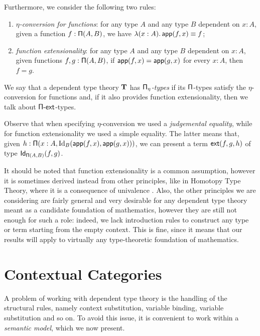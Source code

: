 \noindent
Furthermore, we consider the following two rules:
\begin{enumerate}[resume]
  \item \emph{$\eta$-conversion for functions}: for any type $A$ and any type $B$
    dependent on $x:A$, given a function $f:\operatorname{\mathsf{\Pi}}(A,B)$, we have
    $\lambda(x:A).\operatorname{\mathsf{app}}(f,x)\equiv f$;
  \item \emph{function extensionality}: for any type $A$ and any type $B$ dependent on
    $x:A$, given functions $f,g:\operatorname{\mathsf{\Pi}}(A,B)$, if $\operatorname{\mathsf{app}}(f,x)=\operatorname{\mathsf{app}}(g,x)$ for every
    $x:A$, then $f=g$.
\end{enumerate}

\begin{defn}
  We say that a dependent type theory $\operatorname{\mathbf{T}}$ has \emph{$\operatorname{\mathsf{\Pi}_\eta}$-types} if its
  $\operatorname{\mathsf{\Pi}}$-types satisfy the $\eta$-conversion for functions and, if it also
  provides function extensionality, then we talk about $\operatorname{\mathsf{\Pi-ext}}$-types.
\end{defn}

\begin{rmk}
  Observe that when specifying $\eta$-conversion we used a \emph{judgemental
  equality}, while for function extensionality we used a simple equality. The
  latter means that, given $h:\operatorname{\mathsf{\Pi}}(x:A,\operatorname{Id}_B(\operatorname{\mathsf{app}}(f,x),\operatorname{\mathsf{app}}(g,x)))$, we can
  present a term $\operatorname{\mathsf{ext}}(f,g,h)$ of type $\operatorname{\mathsf{Id}}_{\operatorname{\mathsf{\Pi}}(A,B)}(f,g)$.
\end{rmk}

\begin{rmk}
It should be noted that function extensionality is a common assumption, however
it is sometimes derived instead from other principles, like in Homotopy Type
Theory, where it is a consequence of univalence \cite[Ch.\ 4.9]{Uni13}.
Also, the other principles we are considering are fairly general and very
desirable for any dependent type theory meant as a candidate foundation of
mathematics, however they are still not enough for such a role: indeed, we lack
introduction rules to construct any type or term starting from the empty
context. This is fine, since it means that our results will apply to virtually
any type-theoretic foundation of mathematics.
\end{rmk}

\section{Contextual Categories}

A problem of working with dependent type theory is
the handling of the structural rules, namely context substitution, variable
binding, variable substitution and so on. To avoid this issue, it is convenient
to work within a \emph{semantic model}, which we now present.

